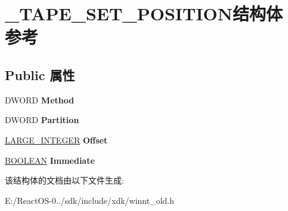\hypertarget{struct___t_a_p_e___s_e_t___p_o_s_i_t_i_o_n}{}\section{\+\_\+\+T\+A\+P\+E\+\_\+\+S\+E\+T\+\_\+\+P\+O\+S\+I\+T\+I\+O\+N结构体 参考}
\label{struct___t_a_p_e___s_e_t___p_o_s_i_t_i_o_n}
\subsection*{Public 属性}
\begin{DoxyCompactItemize}
\item 
\mbox{\label{struct___t_a_p_e___s_e_t___p_o_s_i_t_i_o_n_a473952f8af8d90ec3a8f00e9a672b1c9}} 
D\+W\+O\+RD {\bfseries Method}
\item 
\mbox{\label{struct___t_a_p_e___s_e_t___p_o_s_i_t_i_o_n_a7b82b7c7f95ff9eb8ba0540160673b33}} 
D\+W\+O\+RD {\bfseries Partition}
\item 
\mbox{\label{struct___t_a_p_e___s_e_t___p_o_s_i_t_i_o_n_aea801e5127f40dabd369c79e79ffd3e6}} 
\hyperlink{union___l_a_r_g_e___i_n_t_e_g_e_r}{L\+A\+R\+G\+E\+\_\+\+I\+N\+T\+E\+G\+ER} {\bfseries Offset}
\item 
\mbox{\label{struct___t_a_p_e___s_e_t___p_o_s_i_t_i_o_n_a2f00f020a439eb483f0880b7906997cf}} 
\hyperlink{_processor_bind_8h_a112e3146cb38b6ee95e64d85842e380a}{B\+O\+O\+L\+E\+AN} {\bfseries Immediate}
\end{DoxyCompactItemize}


该结构体的文档由以下文件生成\+:\begin{DoxyCompactItemize}
\item 
E\+:/\+React\+O\+S-\/0../sdk/include/xdk/winnt\+\_\+old.\+h\end{DoxyCompactItemize}
